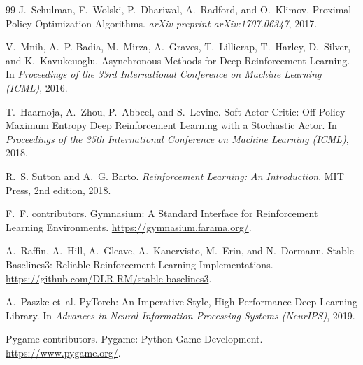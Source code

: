 \documentclass[a4paper,11pt,notitlepage]{report}
\begin{document}
\begin{thebibliography}{99}
J.~Schulman, F.~Wolski, P.~Dhariwal, A.~Radford, and O.~Klimov.
\newblock Proximal Policy Optimization Algorithms.
\newblock \emph{arXiv preprint arXiv:1707.06347}, 2017.

V.~Mnih, A.~P. Badia, M.~Mirza, A.~Graves, T.~Lillicrap, T.~Harley, D.~Silver, and K.~Kavukcuoglu.
\newblock Asynchronous Methods for Deep Reinforcement Learning.
\newblock In \emph{Proceedings of the 33rd International Conference on Machine Learning (ICML)}, 2016.

T.~Haarnoja, A.~Zhou, P.~Abbeel, and S.~Levine.
\newblock Soft Actor-Critic: Off-Policy Maximum Entropy Deep Reinforcement Learning with a Stochastic Actor.
\newblock In \emph{Proceedings of the 35th International Conference on Machine Learning (ICML)}, 2018.

R.~S. Sutton and A.~G. Barto.
\newblock \emph{Reinforcement Learning: An Introduction}.
\newblock MIT Press, 2nd edition, 2018.

F.~F. contributors.
\newblock Gymnasium: A Standard Interface for Reinforcement Learning Environments.
\newblock \url{https://gymnasium.farama.org/}.

A.~Raffin, A.~Hill, A.~Gleave, A.~Kanervisto, M.~Erin, and N.~Dormann.
\newblock Stable-Baselines3: Reliable Reinforcement Learning Implementations.
\newblock \url{https://github.com/DLR-RM/stable-baselines3}.

A.~Paszke et~al.
\newblock PyTorch: An Imperative Style, High-Performance Deep Learning Library.
\newblock In \emph{Advances in Neural Information Processing Systems (NeurIPS)}, 2019.

Pygame contributors.
\newblock Pygame: Python Game Development.
\newblock \url{https://www.pygame.org/}.
\end{thebibliography}
\end{document}
